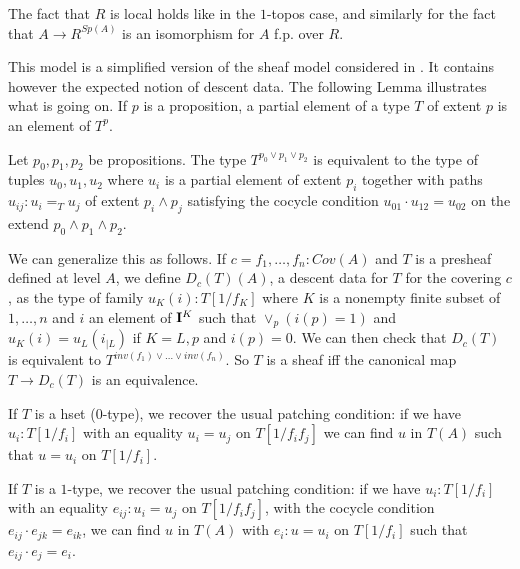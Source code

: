 \medskip

The fact that $R$ is local holds like in the $1$-topos case, and similarly for the fact that
$A\rightarrow R^{Sp(A)}$ is an isomorphism for $A$ f.p. over $R$.

\medskip

 This model is a  simplified version of the sheaf model considered in \cite{CRS21}. It contains however the expected notion
of descent data. The following Lemma illustrates what is going on. If $p$ is a proposition, a partial element of a type $T$ of
extent $p$ is an element of $T^p$.

\begin{lemma}
  Let $p_0,p_1,p_2$ be propositions. The type $T^{p_0\vee p_1\vee p_2}$ is equivalent to the type of tuples $u_0,u_1,u_2$
  where $u_i$ is a partial element of extent $p_i$ together with paths $u_{ij}:u_i =_T u_j$ of extent $p_i\wedge p_j$
  satisfying the cocycle condition $u_{01}\cdot u_{12} = u_{02}$ on the extend $p_0\wedge p_1\wedge p_2$.
\end{lemma}

We can generalize this as follows. If $c = f_1,\dots,f_n:Cov(A)$  and $T$ is a presheaf defined at level $A$, we define
$D_c(T)(A)$, a descent data for $T$ for the covering $c$, as the type of family $u_K(i):T[1/f_K]$ where $K$ is a nonempty
finite subset of $1,\dots,n$ and $i$ an element of $\mathbf{I}^K$ such that $\vee_p (i(p) = 1)$ and $u_K(i) = u_L(i_{|L})$
if $K = L,p$ and $i(p) = 0$. We can then check that $D_c(T)$ is equivalent to $T^{inv(f_1)\vee\dots\vee inv(f_n)}$.
So $T$ is a sheaf iff the canonical map $T\rightarrow D_c(T)$ is an equivalence.

\medskip

If $T$ is a hset ($0$-type), we recover the usual patching condition: if we have $u_i:T[1/f_i]$ with an equality $u_i = u_j$ on
$T[1/f_if_j]$ we can find $u$ in $T(A)$ such that $u = u_i$ on $T[1/f_i]$.

If $T$ is a $1$-type, we recover the usual patching condition: if we have $u_i:T[1/f_i]$ with an equality $e_{ij}:u_i = u_j$ on
$T[1/f_if_j]$, with the cocycle condition $e_{ij}\cdot e_{jk} = e_{ik}$,
we can find $u$ in $T(A)$ with $e_i:u = u_i$ on $T[1/f_i]$ such that $e_{ij}\cdot e_j = e_i$.




